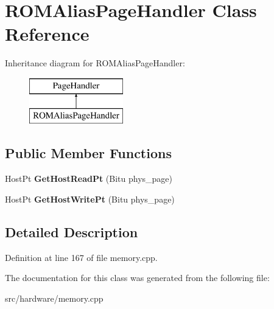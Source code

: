 \hypertarget{classROMAliasPageHandler}{\section{R\-O\-M\-Alias\-Page\-Handler Class Reference}
\label{classROMAliasPageHandler}
}
Inheritance diagram for R\-O\-M\-Alias\-Page\-Handler\-:\begin{figure}[H]
\begin{center}
\leavevmode
\includegraphics[height=2.000000cm]{classROMAliasPageHandler}
\end{center}
\end{figure}
\subsection*{Public Member Functions}
\begin{DoxyCompactItemize}
\item 
\hypertarget{classROMAliasPageHandler_ac9bc56f51008279f62a74204500ec4b3}{Host\-Pt {\bfseries Get\-Host\-Read\-Pt} (Bitu phys\-\_\-page)}\label{classROMAliasPageHandler_ac9bc56f51008279f62a74204500ec4b3}

\item 
\hypertarget{classROMAliasPageHandler_a305a02dd4698bb465b46e96268f2b375}{Host\-Pt {\bfseries Get\-Host\-Write\-Pt} (Bitu phys\-\_\-page)}\label{classROMAliasPageHandler_a305a02dd4698bb465b46e96268f2b375}

\end{DoxyCompactItemize}


\subsection{Detailed Description}


Definition at line 167 of file memory.\-cpp.



The documentation for this class was generated from the following file\-:\begin{DoxyCompactItemize}
\item 
src/hardware/memory.\-cpp\end{DoxyCompactItemize}
